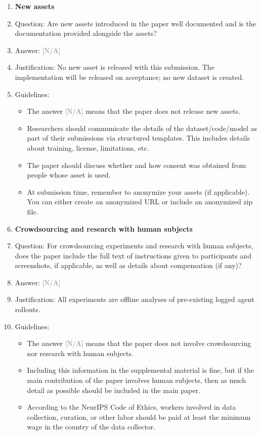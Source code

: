 \documentclass{article}
\providecommand{\answerNA}[1][]{\textcolor{gray}{[N/A] #1}}
\begin{document}
\begin{enumerate}
\item {\bf New assets}
    \item[] Question: Are new assets introduced in the paper well documented and is the documentation provided alongside the assets?
    \item[] Answer: \answerNA{}
    \item[] Justification: No new asset is released with this submission. The implementation will be released on acceptance; no new dataset is created.
    \item[] Guidelines:
    \begin{itemize}
        \item The answer \answerNA{} means that the paper does not release new assets.
        \item Researchers should communicate the details of the dataset\slash code\slash model as part of their submissions via structured templates. This includes details about training, license, limitations, etc.
        \item The paper should discuss whether and how consent was obtained from people whose asset is used.
        \item At submission time, remember to anonymize your assets (if applicable). You can either create an anonymized URL or include an anonymized zip file.
    \end{itemize}

\item {\bf Crowdsourcing and research with human subjects}
    \item[] Question: For crowdsourcing experiments and research with human subjects, does the paper include the full text of instructions given to participants and screenshots, if applicable, as well as details about compensation (if any)?
    \item[] Answer: \answerNA{}
    \item[] Justification: All experiments are offline analyses of pre-existing logged agent rollouts.
    \item[] Guidelines:
    \begin{itemize}
        \item The answer \answerNA{} means that the paper does not involve crowdsourcing nor research with human subjects.
        \item Including this information in the supplemental material is fine, but if the main contribution of the paper involves human subjects, then as much detail as possible should be included in the main paper.
        \item According to the NeurIPS Code of Ethics, workers involved in data collection, curation, or other labor should be paid at least the minimum wage in the country of the data collector.
    \end{itemize}


\end{enumerate}
\end{document}
